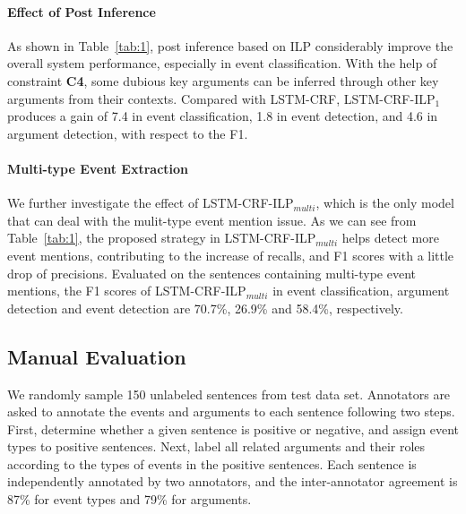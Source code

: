 \paragraph{Effect of Post Inference} 
As shown in Table~\ref{tab:1}, post inference based on ILP considerably improve the overall system performance, especially in event classification. With the help of constraint \textbf{C4},  some dubious key arguments can be inferred through other key arguments from their contexts. Compared with LSTM-CRF, LSTM-CRF-ILP$_1$ produces a gain of 7.4 in event classification, 1.8 in event detection, and 4.6 in argument detection, with respect to the F1. 

\paragraph{Multi-type Event Extraction}
We further investigate the effect of LSTM-CRF-ILP$_{multi}$, which is the only model that can deal with the mulit-type event mention issue. As we can see from Table~\ref{tab:1}, the proposed strategy in LSTM-CRF-ILP$_{multi}$ helps detect more event mentions, contributing to the increase of recalls, and F1 scores with a little drop of precisions. Evaluated on the sentences containing multi-type event mentions, the F1 scores of LSTM-CRF-ILP$_{multi}$ in event classification, argument detection and event detection are 70.7\%, 26.9\% and 58.4\%, respectively. 

\subsection{Manual Evaluation}
We randomly sample 150 unlabeled sentences from test data set. Annotators are asked to annotate the events and arguments to each sentence following two steps. First, determine whether a given sentence is positive or negative, and assign event types to positive sentences. Next, label all related arguments and their roles according to the types of events in the positive sentences. Each sentence is independently annotated by two annotators, and the inter-annotator agreement is 87\% for event types and 79\% for arguments.

